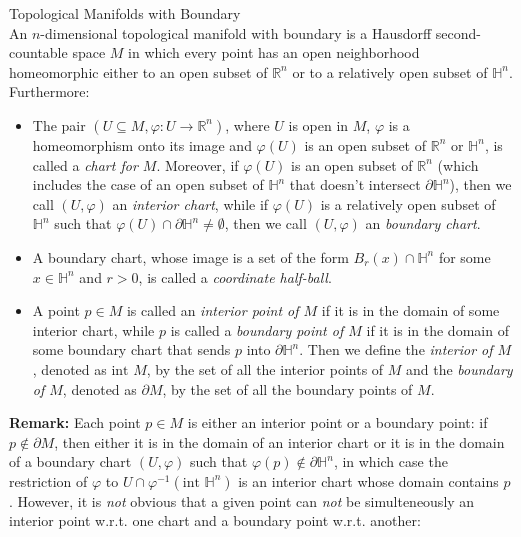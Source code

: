 \begin{definition}{Topological Manifolds with Boundary}\\
An $n$-dimensional topological manifold with boundary is a Hausdorff second-countable space $M$ in which every point has an open neighborhood homeomorphic either to an open subset of $\mathbb{R}^n$ or to a relatively open subset of $\mathbb{H}^n$. Furthermore:
\begin{itemize}
    \item The pair $(U \subseteq M, \varphi:U \to \mathbb{R}^n)$, where $U$ is open in $M$, $\varphi$ is a homeomorphism onto its image and $\varphi(U)$ is an open subset of $\mathbb{R}^n$ or $\mathbb{H}^n$, is called a \textit{chart for $M$}. Moreover, if $\varphi(U)$ is an open subset of $\mathbb{R}^n$ (which includes the case of an open subset of $\mathbb{H}^n$ that doesn't intersect $\partial \mathbb{H}^n$), then we call $(U,\varphi)$ an \textit{interior chart}, while if $\varphi(U)$ is a relatively open subset of $\mathbb{H}^n$ such that $\varphi(U) \cap \partial \mathbb{H}^n\neq \emptyset$, then we call $(U,\varphi)$ an \textit{boundary chart}.

    \item A boundary chart, whose image is a set of the form $B_r(x) \cap \mathbb{H}^n$ for some $x\in \mathbb{H}^n$ and $r>0$, is called a \textit{coordinate half-ball}.

    \item A point $p\in M$ is called an \textit{interior point of $M$} if it is in the domain of some interior chart, while $p$ is called a \textit{boundary point of $M$} if it is in the domain of some boundary chart that sends $p$ into $\partial \mathbb{H}^n$. Then we define the \textit{interior of $M$}, denoted as $\text{int }M$, by the set of all the interior points of $M$ and the \textit{boundary of $M$}, denoted as $\partial M$, by the set of all the boundary points of $M$.
\end{itemize}
\end{definition}

\noindent\textbf{Remark:} Each point $p\in M$ is either an interior point or a boundary point: if $p\notin \partial M$, then either it is in the domain of an interior chart or it is in the domain of a boundary chart $(U,\varphi)$ such that $\varphi(p) \notin \partial \mathbb{H}^n$, in which case the restriction of $\varphi$ to $U \cap \varphi^{-1} (\text{int }\mathbb{H}^n)$ is an interior chart whose domain contains $p$. However, it is \textit{not} obvious that a given point can \textit{not} be simulteneously an interior point w.r.t. one chart and a boundary point w.r.t. another:

